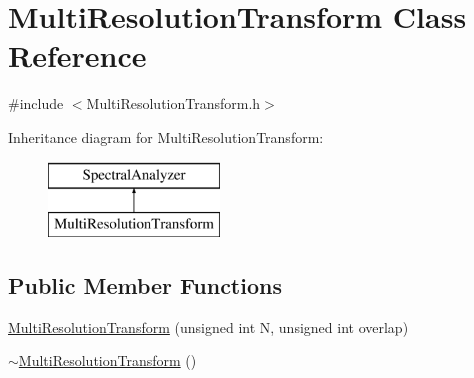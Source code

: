 \hypertarget{class_multi_resolution_transform}{\section{Multi\+Resolution\+Transform Class Reference}
\label{class_multi_resolution_transform}
}


{\ttfamily \#include $<$Multi\+Resolution\+Transform.\+h$>$}

Inheritance diagram for Multi\+Resolution\+Transform\+:\begin{figure}[H]
\begin{center}
\leavevmode
\includegraphics[height=2.000000cm]{class_multi_resolution_transform}
\end{center}
\end{figure}
\subsection*{Public Member Functions}
\begin{DoxyCompactItemize}
\item 
\hyperlink{class_multi_resolution_transform_a1b187ef11930f35eb94eb1e0eca2ba2c}{Multi\+Resolution\+Transform} (unsigned int N, unsigned int overlap)
\item 
\hyperlink{class_multi_resolution_transform_a995b7dbca27bbcde4a7e4a7436ab2469}{$\sim$\+Multi\+Resolution\+Transform} ()
\end{DoxyCompactItemize}



